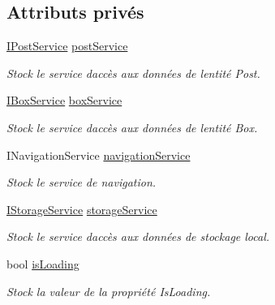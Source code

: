 \subsection*{Attributs privés}
\begin{DoxyCompactItemize}
\item 
\hyperlink{interface_boxes_1_1_services_1_1_post_1_1_i_post_service}{I\+Post\+Service} \hyperlink{class_boxes_1_1_view_models_1_1_box_view_model_a6f7f5373198c65bb2fcaeb11ddcd9437}{post\+Service}
\begin{DoxyCompactList}\small\item\em Stock le service d\textquotesingle{}accès aux données de l\textquotesingle{}entité Post. \end{DoxyCompactList}\item 
\hyperlink{interface_boxes_1_1_services_1_1_box_1_1_i_box_service}{I\+Box\+Service} \hyperlink{class_boxes_1_1_view_models_1_1_box_view_model_a41418c9ca1c39ab2ba45e781eb58e038}{box\+Service}
\begin{DoxyCompactList}\small\item\em Stock le service d\textquotesingle{}accès aux données de l\textquotesingle{}entité Box. \end{DoxyCompactList}\item 
I\+Navigation\+Service \hyperlink{class_boxes_1_1_view_models_1_1_box_view_model_adc660c88b5bfb168d08b5866a298c72c}{navigation\+Service}
\begin{DoxyCompactList}\small\item\em Stock le service de navigation. \end{DoxyCompactList}\item 
\hyperlink{interface_boxes_1_1_services_1_1_storage_1_1_i_storage_service}{I\+Storage\+Service} \hyperlink{class_boxes_1_1_view_models_1_1_box_view_model_a990fdd7bc54aaebe00cc65d77d93360c}{storage\+Service}
\begin{DoxyCompactList}\small\item\em Stock le service d\textquotesingle{}accès aux données de stockage local. \end{DoxyCompactList}\item 
bool \hyperlink{class_boxes_1_1_view_models_1_1_box_view_model_ac2ae5fd2e92a960fb7951ac7e1fe0005}{is\+Loading}
\begin{DoxyCompactList}\small\item\em Stock la valeur de la propriété {\ttfamily Is\+Loading}. \end{DoxyCompactList}\item 

\end{DoxyCompactItemize}
